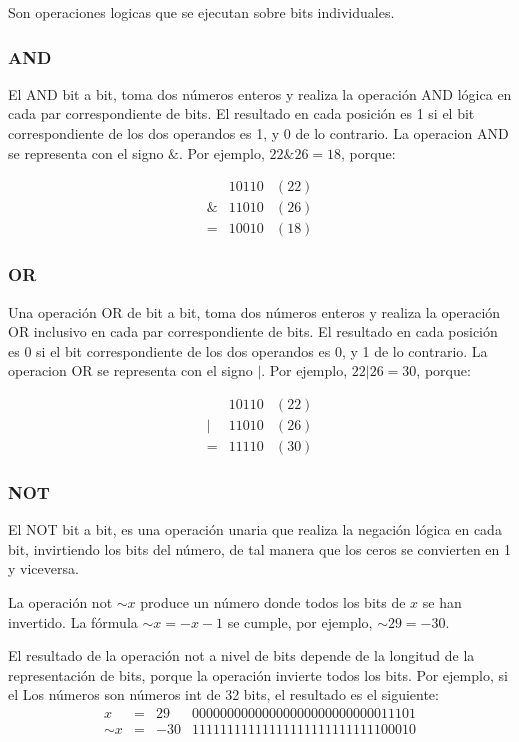 Son operaciones logicas que se ejecutan sobre bits individuales.

\subsubsection{AND}

El AND bit a bit, toma dos números enteros y realiza la operación AND lógica en cada par
correspondiente de bits. El resultado en cada posición es 1 si el bit correspondiente de los dos
operandos es 1, y 0 de lo contrario. La operacion AND se representa con el signo $\&$.  Por ejemplo, $22 \& 26 = 18$, porque:

$$
\begin{array}{ccc}
	& 10110 & (22) \\
	\&	& 11010 & (26) \\
	\hline
	= & 10010 & (18)
\end{array}
$$

\subsubsection{OR}

Una operación OR de bit a bit, toma dos números enteros y realiza la operación OR inclusivo en
cada par correspondiente de bits. El resultado en cada posición es 0 si el bit correspondiente de los
dos operandos es 0, y 1 de lo contrario. La operacion OR se representa con el signo $\vert$. Por ejemplo, $22 \vert 26 = 30$, porque:

$$
\begin{array}{ccc}
	& 10110 & (22) \\
	\vert	& 11010 & (26) \\
	\hline
	= & 11110 & (30)
\end{array}
$$

\subsubsection{NOT}
El NOT bit a bit, es una operación unaria que realiza la negación lógica en cada bit, invirtiendo los
bits del número, de tal manera que los ceros se convierten en 1 y viceversa.

La operación not $\sim x$ produce un número donde todos los bits de $x$ se han invertido. La fórmula $\sim x =-x-1$ se cumple, por ejemplo, $\sim 29=-30$.

El resultado de la operación not a nivel de bits depende de la longitud de la representación de bits, porque la operación invierte todos los bits. Por ejemplo, si el Los números son números int de 32 bits, el resultado es el siguiente:
$$
\begin{array}{cccc}
	x	& = & 29 & 00000000000000000000000000011101 \\
  \sim x	& = & -30  & 11111111111111111111111111100010
\end{array}
$$


